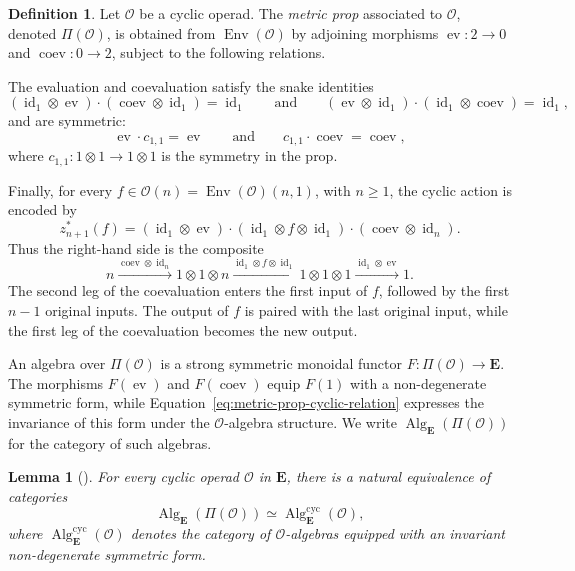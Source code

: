 \documentclass{amsart}
\newcommand{\bE}{\mathbf{E}}
\newcommand{\calO}{\mathcal{O}}
\newcommand{\id}{\operatorname{id}}
\newcommand{\ev}{\operatorname{ev}}
\newcommand{\coev}{\operatorname{coev}}
\newcommand{\Alg}{\operatorname{Alg}}
\newcommand{\Env}{\operatorname{Env}}
\newtheorem{lemma}[theorem]{Lemma}%
\theoremstyle{definition}
\newtheorem{definition}[theorem]{Definition}%
\numberwithin{equation}{section}
\begin{document}
\begin{definition}
\label{def: metric prop}
Let $\calO$ be a cyclic operad. The \emph{metric prop} associated
to $\calO$, denoted $\Pi(\calO)$, is obtained from $\Env(\calO)$
by adjoining morphisms $\ev\colon2\to0$ and $\coev\colon0\to2$,
subject to the following relations.

The evaluation and coevaluation satisfy the snake identities
\begin{equation}
\label{eq:metric-prop-snake}
(\id_1\otimes\ev)\cdot(\coev\otimes\id_1)=\id_1
\qquad\text{and}\qquad
(\ev\otimes\id_1)\cdot(\id_1\otimes\coev)=\id_1,
\end{equation}
and are symmetric:
\begin{equation}
\label{eq:metric-prop-symmetry}
\ev\cdot c_{1,1}=\ev
\qquad\text{and}\qquad
c_{1,1}\cdot\coev=\coev,
\end{equation}
where $c_{1,1}\colon1\otimes1\to1\otimes1$ is the symmetry
in the prop.

Finally, for every $f\in\calO(n)=\Env(\calO)(n,1)$, with $n\geq1$,
the cyclic action is encoded by
\begin{equation}
\label{eq:metric-prop-cyclic-relation}
z_{n+1}^*(f)
=(\id_1\otimes\ev)
 \cdot(\id_1\otimes f\otimes\id_1)
 \cdot(\coev\otimes\id_n).
\end{equation}
Thus the right-hand side is the composite
\[
n
\xrightarrow{\coev\otimes\id_n}
1\otimes1\otimes n
\xrightarrow{\id_1\otimes f\otimes\id_1}
1\otimes1\otimes1
\xrightarrow{\id_1\otimes\ev}
1.
\]
The second leg of the coevaluation enters the first input of $f$,
followed by the first $n-1$ original inputs. The output of $f$ is
paired with the last original input, while the first leg of the
coevaluation becomes the new output.
\end{definition}

An algebra over $\Pi(\calO)$ is a strong symmetric monoidal functor $F\colon\Pi(\calO)\to\bE$. The morphisms $F(\ev)$ and $F(\coev)$ equip $F(1)$ with a non-degenerate symmetric form, while Equation~\eqref{eq:metric-prop-cyclic-relation} expresses the invariance of this form under the $\calO$-algebra structure. We write $\Alg_{\bE}(\Pi(\calO))$ for the category of such algebras.

\begin{lemma}[{\cite[Lemma~3.1.4]{hv_cyclic}}]
\label{lem:algebras-over-metric-prop}
For every cyclic operad $\calO$ in $\bE$, there is a natural equivalence of categories
\[
\Alg_{\bE}(\Pi(\calO))
\simeq
\Alg_{\bE}^{\mathrm{cyc}}(\calO),
\]
where $\Alg_{\bE}^{\mathrm{cyc}}(\calO)$ denotes the category of $\calO$-algebras equipped with an invariant non-degenerate symmetric form.
\end{lemma}
\end{document}
